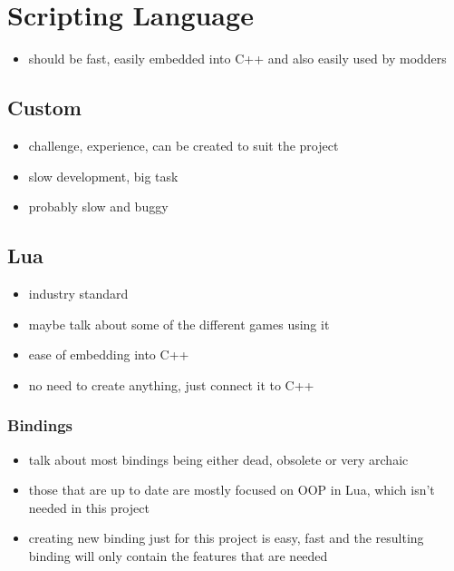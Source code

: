 \section{Scripting Language}

\begin{itemize}
    \item should be fast, easily embedded into C++ and also
        easily used by modders
\end{itemize}

\subsection{Custom}

\begin{itemize}
    \item challenge, experience, can be created to suit the project
    \item slow development, big task
    \item probably slow and buggy
\end{itemize}

\subsection{Lua}

\begin{itemize}
    \item industry standard
    \item maybe talk about some of the different games using it
    \item ease of embedding into C++
    \item no need to create anything, just connect it to C++
\end{itemize}

\subsubsection{Bindings}

\begin{itemize}
    \item talk about most bindings being either dead, obsolete or very
        archaic
    \item those that are up to date are mostly focused on OOP in Lua,
        which isn't needed in this project
    \item creating new binding just for this project is easy, fast and
        the resulting binding will only contain the features that are needed
\end{itemize}

